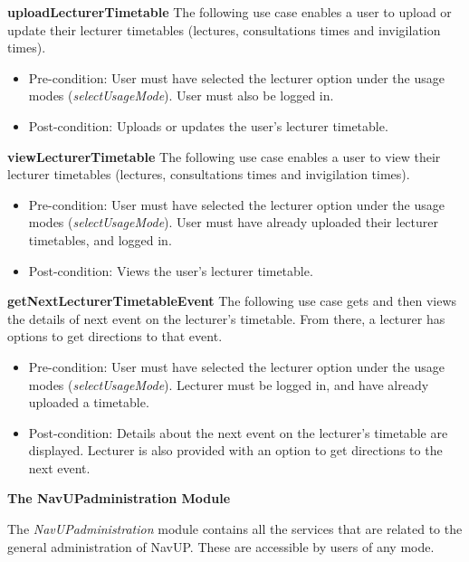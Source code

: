 \documentclass[12pt,a4paper]{article}
\begin{document}
		\textbf{uploadLecturerTimetable}
		The following use case enables a user to upload or update their lecturer timetables (lectures, consultations times and 		invigilation times).

		\begin{itemize}
		  \item Pre-condition: User must have selected the lecturer option under the usage modes (\textit{selectUsageMode}). 					User must also be logged in.
		   \item Post-condition: Uploads or updates the user's lecturer timetable.
		\end{itemize}

	    \textbf{viewLecturerTimetable}
		The following use case enables a user to view their lecturer timetables (lectures, consultations times and 		     		    invigilation times).

		\begin{itemize}
		  \item Pre-condition: User must have selected the lecturer option under the usage modes (\textit{selectUsageMode}). 			        User must have already uploaded their lecturer timetables, and logged in.
		   \item Post-condition: Views the user's lecturer timetable.
		\end{itemize}

	    \textbf{getNextLecturerTimetableEvent}
		The following use case gets and then views the details of next event on the lecturer's timetable. From there, a 			    lecturer has options to get directions to that event.

		\begin{itemize}
		  \item Pre-condition: User must have selected the lecturer option under the usage modes (\textit{selectUsageMode}). 		            Lecturer must be logged in, and have already uploaded a timetable.
		   \item Post-condition: Details about the next event on the lecturer's timetable are displayed. Lecturer is also 						 provided with an option to get directions to the next event.
		\end{itemize}

		\textbf{The NavUPadministration Module} \newline

		The \textit{NavUPadministration} module contains all the services that are related to the general administration of 			NavUP. These are accessible by users of any mode.
\end{document}
